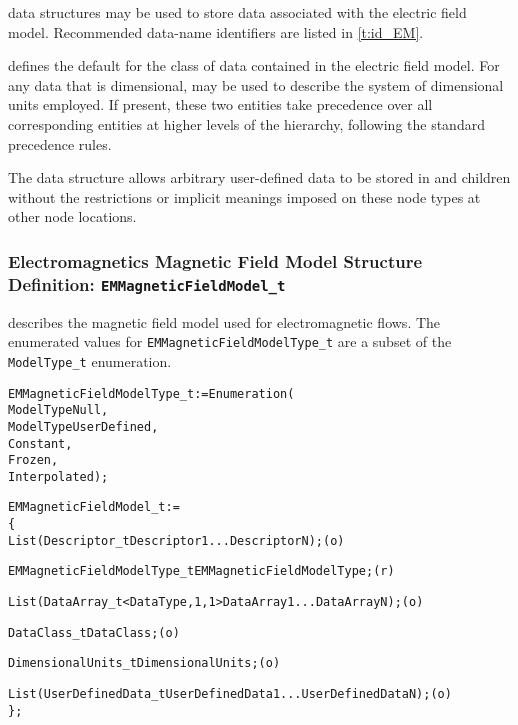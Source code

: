 data structures may be used to store data associated
with the electric field model.
Recommended data-name identifiers are listed in \autoref{t:id_EM}.

 defines the default for the class of data contained in
the electric field model.
For any data that is dimensional,  may be used to
describe the system of dimensional units employed.
If present, these two entities take precedence over all corresponding
entities at higher levels of the hierarchy, following the standard
precedence rules.

The  data structure allows arbitrary
user-defined data to be stored in  and
 children without the restrictions or implicit
meanings imposed on these node types at other node locations.

\subsubsection{Electromagnetics Magnetic Field Model Structure Definition: \texttt{EMMagneticFieldModel\_t}}

 describes the magnetic field model used
for electromagnetic flows.
The enumerated values for \texttt{EMMagneticFieldModelType\_t} are a subset of the
\texttt{ModelType\_t} enumeration.
\begin{alltt}
  EMMagneticFieldModelType\_t := Enumeration(
    ModelTypeNull,
    ModelTypeUserDefined,
    Constant,
    Frozen,
    Interpolated ) ;
\end{alltt}

\begin{alltt}
  EMMagneticFieldModel\_t :=
    \{
    List( Descriptor\_t Descriptor1 ... DescriptorN ) ;                      (o)

    EMMagneticFieldModelType\_t EMMagneticFieldModelType ;                   (r)
    
    List( DataArray\_t<DataType, 1, 1> DataArray1 ... DataArrayN ) ;         (o)

    DataClass\_t DataClass ;                                                 (o)
                
    DimensionalUnits\_t DimensionalUnits ;                                   (o)

    List( UserDefinedData\_t UserDefinedData1 ... UserDefinedDataN ) ;       (o)
    \} ;
\end{alltt}

